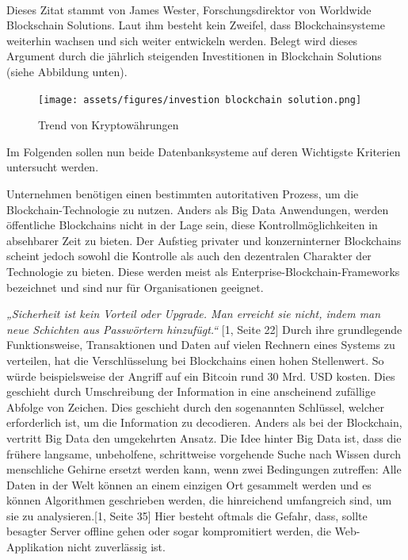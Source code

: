 \paragraph*{\mbox{}}
Dieses Zitat stammt von James Wester, Forschungsdirektor von Worldwide Blockschain Solutions. Laut ihm besteht kein Zweifel, dass Blockchainsysteme weiterhin wachsen und sich weiter entwickeln werden.
Belegt wird dieses Argument durch die jährlich steigenden Investitionen in Blockchain Solutions (siehe Abbildung unten).

\begin{figure}[!ht]
    \caption{Trend von Kryptowährungen}
    \texttt{[image: assets/figures/investion blockchain solution.png]}
    \label{fig:birds7}
\end{figure}

Im Folgenden sollen nun beide Datenbanksysteme auf deren Wichtigste Kriterien untersucht werden.


Unternehmen benötigen einen bestimmten autoritativen Prozess, um die Blockchain-Technologie zu nutzen.
Anders als Big Data Anwendungen, werden öffentliche Blockchains nicht in der Lage sein, diese Kontrollmöglichkeiten in absehbarer Zeit zu bieten.
Der Aufstieg privater und konzerninterner Blockchains scheint jedoch sowohl die Kontrolle als auch den dezentralen Charakter der Technologie zu bieten.
Diese werden meist als Enterprise-Blockchain-Frameworks bezeichnet und sind nur für Organisationen geeignet.


\textit{„Sicherheit ist kein Vorteil oder Upgrade. Man erreicht sie nicht, indem man neue Schichten aus Passwörtern hinzufügt.“} [1, Seite 22]
Durch ihre grundlegende Funktionsweise, Transaktionen und Daten auf vielen Rechnern eines Systems zu verteilen, hat die Verschlüsselung bei Blockchains einen hohen Stellenwert.
So würde beispielsweise der Angriff auf ein Bitcoin rund 30 Mrd. USD kosten.\cite{Bitcoin}
Dies geschieht durch Umschreibung der Information in eine anscheinend zufällige Abfolge von Zeichen. Dies geschieht durch den sogenannten Schlüssel, welcher erforderlich ist, um die Information zu decodieren.
Anders als bei der Blockchain, vertritt Big Data den umgekehrten Ansatz. Die Idee hinter Big Data ist, dass die frühere langsame, unbeholfene, schrittweise vorgehende Suche nach Wissen durch menschliche Gehirne ersetzt werden kann, wenn zwei Bedingungen zutreffen:
Alle Daten in der Welt können an einem einzigen Ort gesammelt werden und es können Algorithmen geschrieben werden, die hinreichend umfangreich sind, um sie zu analysieren.[1, Seite 35]
Hier besteht oftmals die Gefahr, dass, sollte besagter Server offline gehen oder sogar kompromitiert werden, die Web-Applikation nicht zuverlässig ist.

